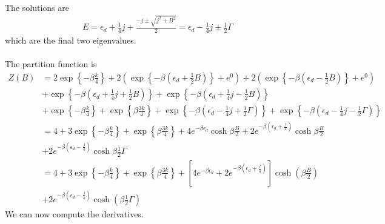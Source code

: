 \documentclass[twoside]{report}
\numberwithin{equation}{section}
\begin{document}
The solutions are
\begin{equation}\begin{aligned}
	E = \epsilon_d + \frac{1}{4}j + \frac{-j \pm \sqrt{j^2 + B^2}}{2} = \epsilon_d - \frac{1}{4}j \pm \frac{1}{2}\Gamma
\end{aligned}\end{equation}
which are the final two eigenvalues.
\\\\The partition function is
\begin{equation}\begin{aligned}
	Z(B) &= 2 \exp\left\{-\beta \frac{k}{4}\right\} + 2\left( \exp\left\{-\beta\left(\epsilon_d + \frac{1}{2} B\right)\right\} + e^0\right) + 2\left( \exp\left\{-\beta\left(\epsilon_d - \frac{1}{2} B\right)\right\} + e^0\right) \\
	     &+ \exp\left\{-\beta\left(\epsilon_d + \frac{1}{4}j + \frac{1}{2} B\right)\right\} + \exp\left\{-\beta\left(\epsilon_d + \frac{1}{4}j - \frac{1}{2} B\right)\right\} \\
	     &+ \exp\left\{-\beta \frac{k}{4}\right\} + \exp\left\{\beta \frac{3k}{4}\right\} + \exp\left\{-\beta\left(\epsilon_d - \frac{1}{4}j + \frac{1}{2}\Gamma\right)\right\} + \exp\left\{-\beta\left( \epsilon_d- \frac{1}{4}j - \frac{1}{2}\Gamma\right)\right\}\\
	     &= 4 + 3\exp\left\{-\beta \frac{k}{4}\right\} + \exp\left\{\beta \frac{3k}{4}\right\} + 4e^{-\beta \epsilon_d}\cosh \beta \frac{B}{2} + 2e^{-\beta \left(\epsilon_d + \frac{j}{4}\right)}\cosh \beta \frac{B}{2}\\
	     &+ 2e^{-\beta\left(\epsilon_d - \frac{j}{4}\right)}\cosh \beta \frac{1}{2}\Gamma\\
	     &= 4 + 3\exp\left\{-\beta \frac{k}{4}\right\} + \exp\left\{\beta \frac{3k}{4}\right\} + \left[4e^{-\beta \epsilon_d} + 2e^{-\beta \left(\epsilon_d + \frac{j}{4}\right)}\right]\cosh \left(\beta \frac{B}{2}\right) \\
	     &+ 2e^{-\beta\left(\epsilon_d - \frac{j}{4}\right)}\cosh \left(\beta \frac{1}{2}\Gamma\right)
\end{aligned}\end{equation}
We can now compute the derivatives.
\end{document}
